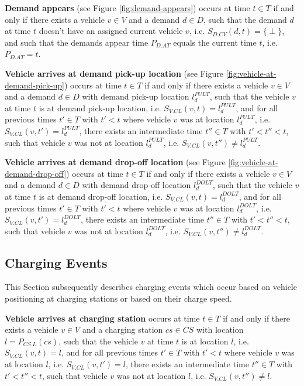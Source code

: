 \documentclass[graybox]{svmult}
\begin{document}
\noindent
\textbf{Demand appears} (see Figure \ref{fig:demand-appears}) 
occurs at time $t \in T$ if and only if there exists a vehicle $v \in V$ and a demand $d \in D$, such that the demand $d$ at time $t$ doesn't have an assigned current vehicle $v$, i.e. $S_{D.CV}(d, t) = \{\perp\}$, and such that the demands appear time $P_{D.AT}$ equals the current time $t$, i.e. $P_{D.AT} = t$.

\vspace{4mm}

\noindent
\textbf{Vehicle arrives at demand pick-up location} (see Figure \ref{fig:vehicle-at-demand-pick-up}) 
occurs at time $t \in T$ if and only if there exists a vehicle $v \in V$ and a demand $d \in D$ with demand pick-up location $l_d^{PULT}$, such that the vehicle $v$ at time $t$ is at demand pick-up location, i.e. $S_{V.CL}(v, t) = l_d^{PULT}$, and for all previous times $t' \in T$ with $t' < t$ where vehicle $v$ was at location $l_d^{PULT}$, i.e. $S_{V.CL}(v, t') = l_d^{PULT}$, there exists an intermediate time $t'' \in T$ with $t' < t'' < t$, such that vehicle $v$ was not at location $l_d^{PULT}$, i.e. $S_{V.CL}(v, t'') \neq l_d^{PULT}$.

\vspace{4mm}

\noindent
\textbf{Vehicle arrives at demand drop-off location} (see Figure \ref{fig:vehicle-at-demand-drop-off})
occurs at time $t \in T$ if and only if there exists a vehicle $v \in V$ and a demand $d \in D$ with demand drop-off location $l_d^{DOLT}$, such that the vehicle $v$ at time $t$ is at demand drop-off location, i.e. $S_{V.CL}(v, t) = l_d^{DOLT}$, and for all previous times $t' \in T$ with $t' < t$ where vehicle $v$ was at location $l_d^{DOLT}$, i.e. $S_{V.CL}(v, t') = l_d^{DOLT}$, there exists an intermediate time $t'' \in T$ with $t' < t'' < t$, such that vehicle $v$ was not at location $l_d^{DOLT}$, i.e. $S_{V.CL}(v, t'') \neq l_d^{DOLT}$.

\vspace{-2mm}

\subsection{Charging Events}
This Section subsequently describes charging events which occur based on vehicle positioning at charging stations or based on their charge speed. 

\vspace{4mm}

\label{sec:charging-events}
\noindent
\textbf{Vehicle arrives at charging station}
occurs at time $t \in T$ if and only if there exists a vehicle $v \in V$ and a charging station $cs \in CS$ with location $l = P_{CS.L}(cs)$, such that the vehicle $v$ at time $t$ is at location $l$, i.e. $S_{V.CL}(v, t) = l$, and for all previous times $t' \in T$ with $t' < t$ where vehicle $v$ was at location $l$, i.e. $S_{V.CL}(v, t') = l$, there exists an intermediate time $t'' \in T$ with $t' < t'' < t$, such that vehicle $v$ was not at location $l$, i.e. $S_{V.CL}(v, t'') \neq l$.
\end{document}
